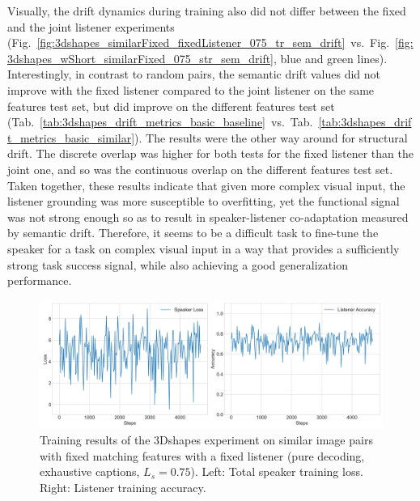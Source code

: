 Visually, the drift dynamics during training also did not differ between the fixed and the joint listener experiments (Fig.~\ref{fig:3dshapes_similarFixed_fixedListener_075_tr_sem_drift}~vs.~Fig.~\ref{fig:3dshapes_wShort_similarFixed_075_str_sem_drift}, blue and green lines). Interestingly, in contrast to random pairs, the semantic drift values did not improve with the fixed listener compared to the joint listener on the same features test set, but did improve on the different features test set (Tab.~\ref{tab:3dshapes_drift_metrics_basic_baseline}~vs.~Tab.~\ref{tab:3dshapes_drift_metrics_basic_similar}). The results were the other way around for structural drift. The discrete overlap was higher for both tests for the fixed listener than the joint one, and so was the continuous overlap on the different features test set.
Taken together, these results indicate that given more complex visual input, the listener grounding was more susceptible to overfitting, yet the functional signal was not strong enough so as to result in speaker-listener co-adaptation measured by semantic drift. Therefore, it seems to be a difficult task to fine-tune the speaker for a task on complex visual input in a way that provides a sufficiently strong task success signal, while also achieving a good generalization performance.

\begin{figure}[h]
	\centering
	\includegraphics[width=\linewidth]{images/3dshapes_fixedListener_similarFixed_exh_075_losses.png}
	\caption{Training results of the 3Dshapes experiment on similar image pairs with fixed matching features with a fixed listener (pure decoding, exhaustive captions, $L_s = 0.75$). Left: Total speaker training loss. Right: Listener training accuracy.}
	\label{fig:3dshapes_similarFixed_fixedListener_075_speaker_loss_listener_acc}
\end{figure}

